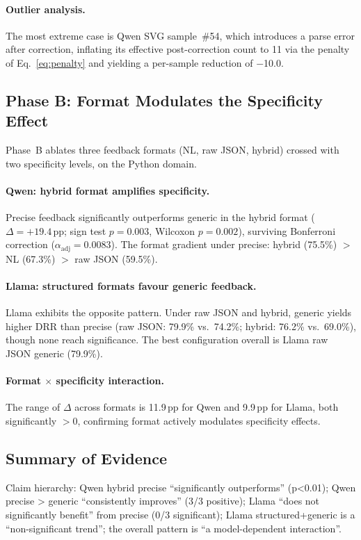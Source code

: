 \paragraph{Outlier analysis.}
The most extreme case is Qwen SVG sample~\#54, which introduces a parse error after correction, inflating its effective post-correction count to 11 via the penalty of Eq.~\ref{eq:penalty} and yielding a per-sample reduction of $-$10.0.

\subsection{Phase B: Format Modulates the Specificity Effect}
\label{sec:results-phaseB}

Phase~B ablates three feedback formats (NL, raw JSON, hybrid) crossed with two specificity levels, on the Python domain.

\paragraph{Qwen: hybrid format amplifies specificity.}
Precise feedback significantly outperforms generic in the hybrid format ($\Delta = +19.4$\,pp; sign test $p = 0.003$, Wilcoxon $p = 0.002$), surviving Bonferroni correction ($\alpha_\text{adj} = 0.0083$). The format gradient under precise: hybrid (75.5\%) $>$ NL (67.3\%) $>$ raw JSON (59.5\%).

\paragraph{Llama: structured formats favour generic feedback.}
Llama exhibits the opposite pattern. Under raw JSON and hybrid, generic yields higher DRR than precise (raw JSON: 79.9\% vs.\ 74.2\%; hybrid: 76.2\% vs.\ 69.0\%), though none reach significance. The best configuration overall is Llama raw JSON generic (79.9\%).

\paragraph{Format $\times$ specificity interaction.}
The range of $\Delta$ across formats is 11.9\,pp for Qwen and 9.9\,pp for Llama, both significantly $> 0$, confirming format actively modulates specificity effects.

\subsection{Summary of Evidence}
\label{sec:results-summary}

Claim hierarchy: Qwen hybrid precise ``significantly outperforms'' (p<0.01); Qwen precise > generic ``consistently improves'' (3/3 positive); Llama ``does not significantly benefit'' from precise (0/3 significant); Llama structured+generic is a ``non-significant trend''; the overall pattern is ``a model-dependent interaction''.